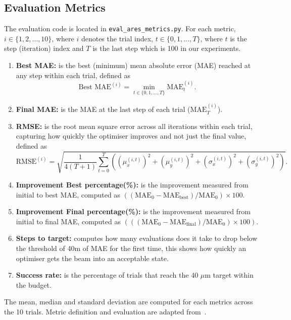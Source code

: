 \subsection{Evaluation Metrics}
The evaluation code is located in \texttt{eval\_ares\_metrics.py}. 
For each metric, $i \in \{1,2,\ldots,10\}$, where $i$ denotes the trial index, $t \in \{0,1,\ldots,T\}$, where $t$ is the step (iteration) index and $T$ is the last step which is 100 in our experiments.
\begin{enumerate}
    \item \textbf{Best MAE:} is the best (minimum) mean absolute error (MAE) reached at any step within each trial, defined as 
    \begin{equation}
        \text{Best MAE}^{(i)} = \min_{t \in \{0, 1, \ldots, T\}} \text{MAE}_t^{(i)}.
    \end{equation}
    \item \textbf{Final MAE:} is the MAE at the last step of each trial ($\text{MAE}_T^{(i)}$).
    \item \textbf{RMSE:} is the root mean square error across all iterations within each trial, capturing how quickly the optimiser improves and not just the final value, defined as
    \begin{equation}
        \text{RMSE}^{(i)} = \sqrt{\frac{1}{4(T+1)} \sum_{t=0}^{T} \left( (\mu_x^{(i,t)})^2 + (\mu_y^{(i,t)})^2 + (\sigma_x^{(i,t)})^2 + (\sigma_y^{(i,t)})^2 \right)}.
    \end{equation}
    \item \textbf{Improvement Best percentage(\%):} is the improvement measured from initial to best MAE, computed as $((\text{MAE}_0 - \text{MAE}_{\text{best}})/\text{MAE}_0) \times 100$.
    \item \textbf{Improvement Final percentage(\%):} is the improvement measured from initial to final MAE, computed as $(((\text{MAE}_0 - \text{MAE}_{\text{final}})/\text{MAE}_0) \times 100)$.

    \item \textbf{Steps to target:} computes how many evaluations does it take to drop below the threshold of \SI{40}{\mu}m of MAE for the first time, this shows how quickly an optimiser gets the beam into an acceptable state.
    \item \textbf{Success rate:} is the percentage of trials that reach the 40 $\mu$m target within the budget.
\end{enumerate}

The mean, median and standard deviation are computed for each metrics across the 10 trials.
Metric definition and evaluation are adapted from~\cite{kaiser2024bridging, kaiser2024rl}.